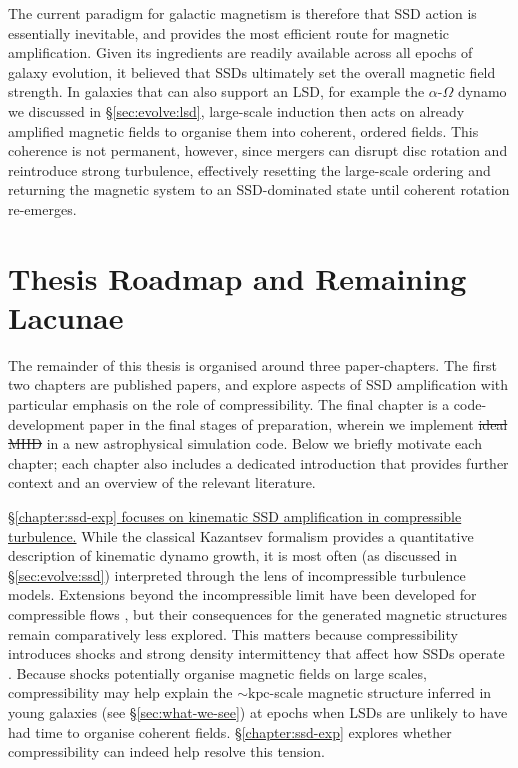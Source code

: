 \documentclass[12pt,twoside]{extreport}
\makeatletter
\newcommand{\eg}{e.g.,\xspace} %
\providecommand{\DIFaddtex}[1]{{\protect\color{DIFgreen}\uwave{#1}}} %
\providecommand{\DIFdeltex}[1]{{\protect\color{DIFpurple}\sout{#1}}} %
\providecommand{\DIFaddbegin}{} %
\providecommand{\DIFaddend}{} %
\providecommand{\DIFdelbegin}{} %
\providecommand{\DIFdelend}{} %
\providecommand{\DIFadd}[1]{\texorpdfstring{\DIFaddtex{#1}}{#1}} %
\providecommand{\DIFdel}[1]{\texorpdfstring{\DIFdeltex{#1}}{}} %
\providecommand{\DIFscaledelfig}{0.5}
\newlength{\DIFdelgraphicswidth} %
\newlength{\DIFdelgraphicsheight} %
\providecommand{\DIFaddincludegraphics}[2][]{{\color{DIFgreen}\fbox{\DIFOincludegraphics[#1]{#2}}}} %
\providecommand{\DIFdelincludegraphics}[2][]{%
\sbox{\DIFdelgraphicsbox}{\DIFOincludegraphics[#1]{#2}}%
\settoboxwidth{\DIFdelgraphicswidth}{\DIFdelgraphicsbox} %
\settoboxtotalheight{\DIFdelgraphicsheight}{\DIFdelgraphicsbox} %
\scalebox{\DIFscaledelfig}{%
\parbox[b]{\DIFdelgraphicswidth}{\usebox{\DIFdelgraphicsbox}\\[-\baselineskip] \rule{\DIFdelgraphicswidth}{0em}}\llap{\resizebox{\DIFdelgraphicswidth}{\DIFdelgraphicsheight}{%
\setlength{\unitlength}{\DIFdelgraphicswidth}%
\begin{picture}(1,1)%
\thicklines\linethickness{2pt} %
{\color{DIFpurple}\put(0,0){\framebox(1,1){}}}%
{\color{DIFpurple}\put(0,0){\line( 1,1){1}}}%
{\color{DIFpurple}\put(0,1){\line(1,-1){1}}}%
\end{picture}%
}\hspace*{3pt}}} %
} %
\DeclareRobustCommand{\DIFaddbegin}{\DIFOaddbegin \let\includegraphics\DIFaddincludegraphics} %
\DeclareRobustCommand{\DIFaddend}{\DIFOaddend \let\includegraphics\DIFOincludegraphics} %
\DeclareRobustCommand{\DIFdelbegin}{\DIFOdelbegin \let\includegraphics\DIFdelincludegraphics} %
\DeclareRobustCommand{\DIFdelend}{\DIFOaddend \let\includegraphics\DIFOincludegraphics} %
\let\sout@orig\sout %
\renewcommand{\sout}[1]{\ifmmode\text{\sout@orig{\ensuremath{#1}}}\else\sout@orig{#1}\fi} %
\makeatother
\begin{document}
The current paradigm for galactic magnetism is therefore that SSD action is essentially inevitable, and provides the most efficient route for magnetic amplification. Given its ingredients are readily available across all epochs of galaxy evolution, it believed that SSDs ultimately set the overall magnetic field strength. In galaxies that can also support an LSD, for example the $\alpha$-$\Omega$ dynamo we discussed in \S\ref{sec:evolve:lsd}, large-scale induction then acts on already amplified magnetic fields to organise them into coherent, ordered fields. This coherence is not permanent, however, since mergers can disrupt disc rotation and reintroduce strong turbulence, effectively resetting the large-scale ordering and returning the magnetic system to an SSD-dominated state until coherent rotation re-emerges.


\section{Thesis Roadmap and Remaining Lacunae}
\label{sec:intro:roadmap}

The remainder of this thesis is organised around three paper-chapters. The first two chapters are published papers, and explore aspects of SSD amplification with particular emphasis on the role of compressibility. The final chapter is a code-development paper in the final stages of preparation, wherein we implement \DIFdelbegin \DIFdel{ideal MHD }\DIFdelend \DIFaddbegin \DIFadd{an MHD module }\DIFaddend in a new astrophysical simulation code. Below we briefly motivate each chapter; each chapter also includes a dedicated introduction that provides further context and an overview of the relevant literature.

\uline{\S\ref{chapter:ssd-exp} focuses on kinematic SSD amplification in compressible turbulence.} While the classical Kazantsev formalism provides a quantitative description of kinematic dynamo growth, it is most often (as discussed in \S\ref{sec:evolve:ssd}) interpreted through the lens of incompressible turbulence models. Extensions beyond the incompressible limit have been developed for compressible flows \citep[\eg][]{schober2012magnetic, bovino2013turbulent}, but their consequences for the generated magnetic structures remain comparatively less explored. This matters because compressibility introduces shocks and strong density intermittency that affect how SSDs operate \citep{federrath2016magnetic}. Because shocks potentially organise magnetic fields on large scales, compressibility may help explain the $\sim \mathrm{kpc}$-scale magnetic structure inferred in young galaxies (see \S\ref{sec:what-we-see}) at epochs when LSDs are unlikely to have had time to organise coherent fields. \S\ref{chapter:ssd-exp} explores whether compressibility can indeed help resolve this tension.
\end{document}
